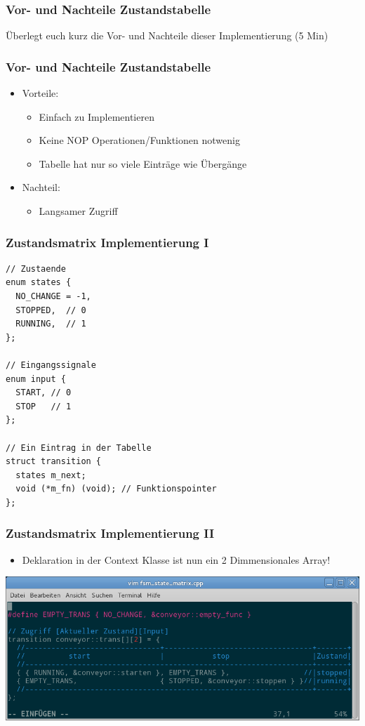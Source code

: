\documentclass{beamer}
\begin{document}
\begin{frame}
 \frametitle{Vor- und Nachteile Zustandstabelle}
 \"Uberlegt euch kurz die Vor- und Nachteile dieser Implementierung (5 Min)
\end{frame}

\begin{frame}
 \frametitle{Vor- und Nachteile Zustandstabelle}
 \begin{itemize}
  \item Vorteile:
  \begin{itemize}
   \item Einfach zu Implementieren
   \item Keine NOP Operationen/Funktionen notwenig
   \item Tabelle hat nur so viele Eintr\"age wie \"Uberg\"ange
  \end{itemize}
  \item Nachteil:
  \begin{itemize}
   \item Langsamer Zugriff
  \end{itemize}
 \end{itemize}
\end{frame}

\begin{frame}[fragile]
 \frametitle{Zustandsmatrix Implementierung I}
 \begin{lstlisting}
// Zustaende
enum states {
  NO_CHANGE = -1,
  STOPPED,  // 0
  RUNNING,  // 1
};

// Eingangssignale
enum input {
  START, // 0
  STOP   // 1
};

// Ein Eintrag in der Tabelle
struct transition {
  states m_next;
  void (*m_fn) (void); // Funktionspointer
};
 \end{lstlisting}
\end{frame}

\begin{frame}
 \frametitle{Zustandsmatrix Implementierung II}
 \begin{itemize}
  \item Deklaration in der Context Klasse ist nun ein 2 Dimmensionales Array!
 \end{itemize}
 \includegraphics[scale=.4]{img/matrix_vim.png}
\end{frame}
\end{document}
